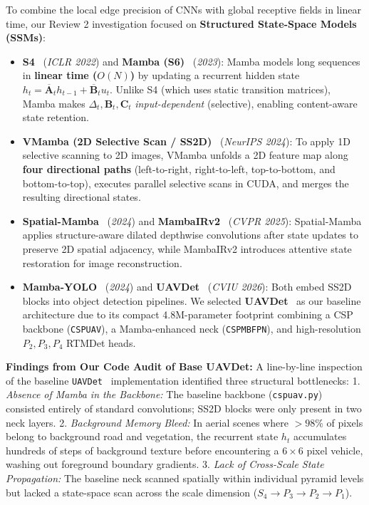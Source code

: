 \documentclass[11pt,a4paper]{article}
\begin{document}
To combine the local edge precision of CNNs with global receptive fields in linear time, our Review 2 investigation focused on \textbf{Structured State-Space Models (SSMs)}:
\begin{itemize}[leftmargin=1.5em]
    \item \textbf{S4}~\cite{gu2022s4} (\emph{ICLR 2022}) and \textbf{Mamba (S6)}~\cite{gu2023mamba} (\emph{2023}): Mamba models long sequences in \textbf{linear time ($O(N)$)} by updating a recurrent hidden state $h_t = \overline{\mathbf{A}}_t h_{t-1} + \overline{\mathbf{B}}_t u_t$. Unlike S4 (which uses static transition matrices), Mamba makes $\Delta_t, \mathbf{B}_t, \mathbf{C}_t$ \emph{input-dependent} (selective), enabling content-aware state retention.
    \item \textbf{VMamba (2D Selective Scan / SS2D)}~\cite{liu2024vmamba} (\emph{NeurIPS 2024}): To apply 1D selective scanning to 2D images, VMamba unfolds a 2D feature map along \textbf{four directional paths} (left-to-right, right-to-left, top-to-bottom, and bottom-to-top), executes parallel selective scans in CUDA, and merges the resulting directional states.
    \item \textbf{Spatial-Mamba}~\cite{xiao2024spatialmamba} (\emph{2024}) and \textbf{MambaIRv2}~\cite{guo2025mambairv2} (\emph{CVPR 2025}): Spatial-Mamba applies structure-aware dilated depthwise convolutions after state updates to preserve 2D spatial adjacency, while MambaIRv2 introduces attentive state restoration for image reconstruction.
    \item \textbf{Mamba-YOLO}~\cite{wang2024mambayolo} (\emph{2024}) and \textbf{UAVDet}~\cite{yang2026uavdet} (\emph{CVIU 2026}): Both embed SS2D blocks into object detection pipelines. We selected \textbf{UAVDet}~\cite{yang2026uavdet} as our baseline architecture due to its compact 4.8M-parameter footprint combining a CSP backbone (\texttt{CSPUAV}), a Mamba-enhanced neck (\texttt{CSPMBFPN}), and high-resolution $P_2, P_3, P_4$ RTMDet heads.
\end{itemize}

\textbf{Findings from Our Code Audit of Base UAVDet:} A line-by-line inspection of the baseline \texttt{UAVDet}~\cite{yang2026uavdet} implementation identified three structural bottlenecks:
1. \emph{Absence of Mamba in the Backbone:} The baseline backbone (\texttt{cspuav.py}) consisted entirely of standard convolutions; SS2D blocks were only present in two neck layers.
2. \emph{Background Memory Bleed:} In aerial scenes where $>98\%$ of pixels belong to background road and vegetation, the recurrent state $h_t$ accumulates hundreds of steps of background texture before encountering a $6\times 6$ pixel vehicle, washing out foreground boundary gradients.
3. \emph{Lack of Cross-Scale State Propagation:} The baseline neck scanned spatially within individual pyramid levels but lacked a state-space scan across the scale dimension ($S_4 \rightarrow P_3 \rightarrow P_2 \rightarrow P_1$).
\end{document}
